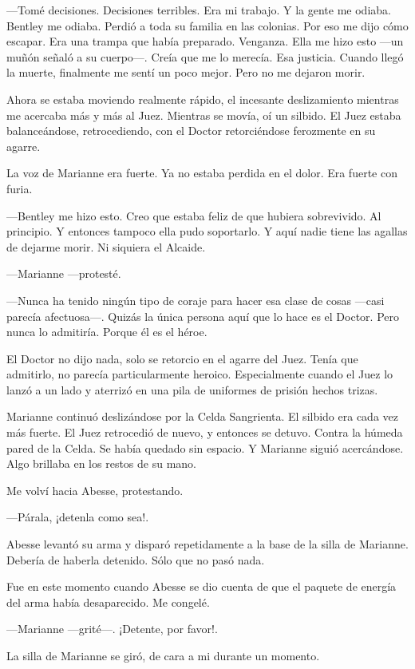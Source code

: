 ---Tomé decisiones. Decisiones terribles. Era mi trabajo. Y la gente me
odiaba. Bentley me odiaba. Perdió a toda su familia en las colonias. Por
eso me dijo cómo escapar. Era una trampa que había preparado. Venganza.
Ella me hizo esto ---un muñón señaló a su cuerpo---. Creía que me lo
merecía. Esa justicia. Cuando llegó la muerte, finalmente me sentí un
poco mejor. Pero no me dejaron morir.

Ahora se estaba moviendo realmente rápido, el incesante deslizamiento
mientras me acercaba más y más al Juez. Mientras se movía, oí un
silbido. El Juez estaba balanceándose, retrocediendo, con el Doctor
retorciéndose ferozmente en su agarre.

La voz de Marianne era fuerte. Ya no estaba perdida en el dolor. Era
fuerte con furia.

---Bentley me hizo esto. Creo que estaba feliz de que hubiera
sobrevivido. Al principio. Y entonces tampoco ella pudo soportarlo. Y
aquí nadie tiene las agallas de dejarme morir. Ni siquiera el Alcaide.

---Marianne ---protesté.

---Nunca ha tenido ningún tipo de coraje para hacer esa clase de cosas
---casi parecía afectuosa---. Quizás la única persona aquí que lo hace
es el Doctor. Pero nunca lo admitiría. Porque él es el héroe.

El Doctor no dijo nada, solo se retorcio en el agarre del Juez. Tenía
que admitirlo, no parecía particularmente heroico. Especialmente cuando
el Juez lo lanzó a un lado y aterrizó en una pila de uniformes de
prisión hechos trizas.

Marianne continuó deslizándose por la Celda Sangrienta. El silbido era
cada vez más fuerte. El Juez retrocedió de nuevo, y entonces se detuvo.
Contra la húmeda pared de la Celda. Se había quedado sin espacio. Y
Marianne siguió acercándose. Algo brillaba en los restos de su mano.

Me volví hacia Abesse, protestando.

---Párala, ¡detenla como sea!.

Abesse levantó su arma y disparó repetidamente a la base de la silla de
Marianne. Debería de haberla detenido. Sólo que no pasó nada.

Fue en este momento cuando Abesse se dio cuenta de que el paquete de
energía del arma había desaparecido. Me congelé.

---Marianne ---grité---. ¡Detente, por favor!.

La silla de Marianne se giró, de cara a mi durante un momento.

